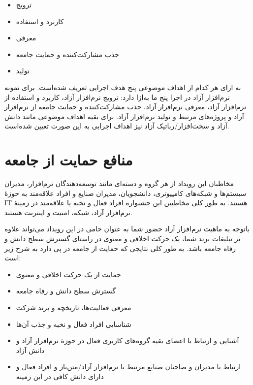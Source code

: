 \documentclass{article}
\begin{document}
{{\begin{flushright}
\begin{itemize}
\item ترویج
\item کاربرد و استفاده
\item معرفی
\item جذب مشارکت‌کننده و حمایت جامعه
\item تولید
\end{itemize}
\end{flushright}

به ازای هر کدام از اهداف موضوعی پنج هدف اجرایی تعریف شده‌است. برای نمونه نرم‌افزار آزاد در اجرا پنج ما به‌ازا دارد: ترویج نرم‌افزار آزاد، کاربرد و استفاده از نرم‌افزار آزاد، معرفی نرم‌افزار آزاد، جذب مشارکت‌کننده و حمایت جامعه از نرم‌افزار آزاد و پروژه‌های مرتبط و تولید نرم‌افزار آزاد. برای بقیه اهداف موضوعی مانند دانش آزاد و سخت‌افزار/رباتیک آزاد نیز اهداف اجرایی به این صورت تعیین شده‌است.

\section{منافع حمایت از جامعه}
مخاطبان این رویداد از هر گروه و دسته‌ای مانند توسعه‌دهندگان نرم‌افزار، مدیران سیستم‌ها و شبکه‌های کامپیوتری، دانشجویان، مدیران صنایع و افراد علاقه‌مند به حوزهٔ IT  هستند. به طور کلی مخاطبین این جشنواره افراد فعال و نخبه یا علاقه‌مند در زمینهٔ نرم‌افزار آزاد، شبکه، امنیت و اینترنت هستند.

\begin{flushright}

باتوجه به ماهیت نرم‌افزار آزاد حضور شما به عنوان حامی در این رویداد می‌تواند علاوه‌ بر تبلیغات برند شما، یک حرکت اخلاقی و معنوی در راستای گسترش سطح دانش و رفاه جامعه باشد. به طور کلی نتایجی که حمایت از جامعه در پی دارد به شرح زیر است:

\begin{itemize}
\item حمایت از یک حرکت اخلاقی و معنوی
\item گسترش سطح دانش و رفاه جامعه
\item معرفی فعالیت‌ها، تاریخچه و برند شرکت
\item شناسایی افراد فعال و نخبه و جذب آن‌ها
\item آشنایی و ارتباط با اعضای بقیه گروه‌های کاربری فعال در حوزهٔ نرم‌افزار آزاد و دانش آزاد
\item ارتباط با مدیران و صاحبان صنایع مرتبط با نرم‌افزار آزاد/متن‌باز و افراد فعال و دارای دانش کافی در این زمینه
\end{itemize}


\end{flushright}}}
\end{document}
